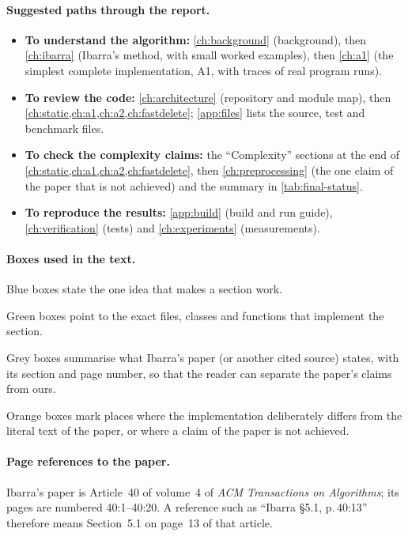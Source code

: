 \documentclass[11pt,a4paper,oneside]{report}
\theoremstyle{plain}
\theoremstyle{definition}
\theoremstyle{remark}
\begin{document}
\paragraph{Suggested paths through the report.}
\begin{itemize}
\item \textbf{To understand the algorithm:} \cref{ch:background} (background), then
  \cref{ch:ibarra} (Ibarra's method, with small worked examples), then
  \cref{ch:a1} (the simplest complete implementation, A1, with traces of real program runs).
\item \textbf{To review the code:} \cref{ch:architecture} (repository and module map), then
  \cref{ch:static,ch:a1,ch:a2,ch:fastdelete}; \cref{app:files} lists the source, test and benchmark files.
\item \textbf{To check the complexity claims:} the ``Complexity'' sections at the end of
  \cref{ch:static,ch:a1,ch:a2,ch:fastdelete}, then \cref{ch:preprocessing} (the one
  claim of the paper that is not achieved) and the summary in \cref{tab:final-status}.
\item \textbf{To reproduce the results:} \cref{app:build} (build and run guide),
  \cref{ch:verification} (tests) and \cref{ch:experiments} (measurements).
\end{itemize}

\paragraph{Boxes used in the text.}
\begin{keyidea}
Blue boxes state the one idea that makes a section work.
\end{keyidea}
\begin{incode}
Green boxes point to the exact files, classes and functions that implement the section.
\end{incode}
\begin{paperbox}
Grey boxes summarise what Ibarra's paper (or another cited source) states, with its section
and page number, so that the reader can separate the paper's claims from ours.
\end{paperbox}
\begin{caution}
Orange boxes mark places where the implementation deliberately differs from the literal text of
the paper, or where a claim of the paper is not achieved.
\end{caution}

\paragraph{Page references to the paper.} Ibarra's paper is Article~40 of volume~4 of
\emph{ACM Transactions on Algorithms}; its pages are numbered 40:1--40:20. A reference such as
``Ibarra \S5.1, p.\,40:13'' therefore means Section~5.1 on page~13 of that article.
\end{document}

